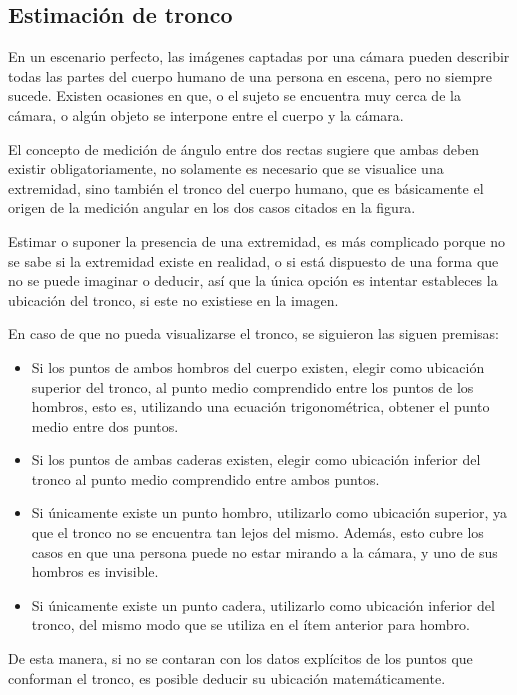 \documentclass[a4paper,12pt,oneside,spanish]{book}
\begin{document}
\subsection{Estimación de tronco}
En un escenario perfecto, las imágenes captadas por una cámara pueden describir todas las partes del cuerpo humano de una persona en escena, pero no siempre sucede. Existen ocasiones en que, o el sujeto se encuentra muy cerca de la cámara, o algún objeto se interpone entre el cuerpo y la cámara.\par

El concepto de medición de ángulo entre dos rectas sugiere que ambas deben existir  obligatoriamente, no solamente es necesario que se visualice una extremidad, sino también el tronco del cuerpo humano, que es básicamente el origen de la medición angular en los dos casos citados en la figura. \par

Estimar o suponer la presencia de una extremidad, es más complicado porque no se sabe si la extremidad existe en realidad, o si está dispuesto de una forma que no se puede imaginar o deducir, así que la única opción es intentar estableces la ubicación del tronco, si este no existiese en la imagen.\par

En caso de que no pueda visualizarse el tronco, se siguieron las siguen premisas:
\begin{itemize}
	\item Si los puntos de ambos hombros del cuerpo existen, elegir como ubicación superior del tronco, al punto medio comprendido entre los puntos de los hombros, esto es, utilizando una ecuación trigonométrica, obtener el punto medio entre dos puntos.
	\item Si los puntos de ambas caderas existen, elegir como ubicación inferior del tronco al punto medio comprendido entre ambos puntos.
	\item Si únicamente existe un punto hombro, utilizarlo como ubicación superior, ya que el tronco no se encuentra tan lejos del mismo. Además, esto cubre los casos en que una persona puede no estar mirando a la cámara, y uno de sus hombros es invisible.
	\item Si únicamente existe un punto cadera, utilizarlo como ubicación inferior del tronco, del mismo modo que se utiliza en el ítem anterior para hombro. 
\end{itemize}
	
De esta manera, si no se contaran con los datos explícitos de los puntos que conforman el tronco, es posible deducir su ubicación matemáticamente.\par
\end{document}
